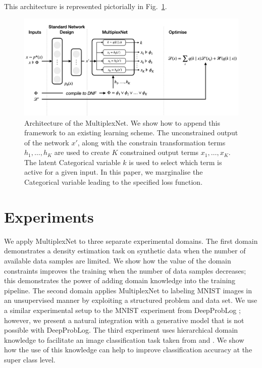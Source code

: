 \documentclass[letterpaper]{article} %
\begin{document}
This architecture is represented pictorially in Fig.~\ref{fig:pictorial_architecture}.

\begin{figure}
  \centering
  \includegraphics[width=\textwidth]{images/multiplexnet_architecture_overview.png}
  \caption{Architecture of the MultiplexNet. We show how to append this framework to an existing learning scheme. The unconstrained output of the network $x'$, along with the constrain transformation terms $h_1, \dots , h_K$ are used to create $K$ constrained output terms $x_1, \dots , x_K$. The latent Categorical variable $k$ is used to select which term is active for a given input. In this paper, we marginalise the Categorical variable leading to the specified loss function.}
  \label{fig:pictorial_architecture}
\end{figure}

\section{Experiments}
\label{sec:experiments}

We apply MultiplexNet to three separate experimental domains.
The first domain demonstrates a density estimation task on synthetic data when the number of available data samples are limited.
We show how the value of the domain constraints improves the training when the number of data samples decreases; this demonstrates the power of adding domain knowledge into the training pipeline.
The second domain applies MultiplexNet to labeling MNIST images in an unsupervised manner by exploiting a structured problem and data set.
We use a similar experimental setup to the MNIST experiment from DeepProbLog \citep{manhaeve2018deepproblog}; however, we present a natural integration with a generative model that is not possible with DeepProbLog.
The third experiment uses hierarchical domain knowledge to facilitate an image classification task taken from \citet{fischer2018dl2} and \citet{xu2017semantic}.
We show how the use of this knowledge can help to improve classification accuracy at the super class level.
\end{document}
